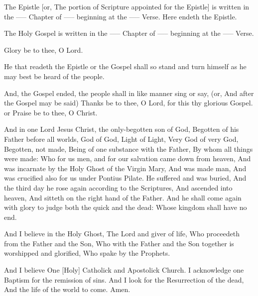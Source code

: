 
The Epistle [or, The portion of Scripture appointed for the Epistle] is written in the ----- Chapter of ----- beginning at the ----- Verse. 
 Here endeth the Epistle.

The Holy Gospel is written in the ----- Chapter of ----- beginning at the ----- Verse.
\centerline{\R Glory be to thee, O Lord.}

He that readeth the Epistle or the Gospel shall so stand and turn himself as he may best be heard of the people.

And, the Gospel ended, the people shall in like manner sing or say, (or, And after the Gospel may be said)
Thanks be to thee, O Lord, for this thy glorious Gospel. %
or
Praise be to thee, O Christ.




And in one Lord Jesus Christ, the only-begotten son of God, Begotten of his Father before all worlds, God of God, Light of Light, Very God of very God, Begotten, not made, Being of one substance with the Father, By whom all things were made: Who for us men, and for our salvation came down from heaven, And was incarnate by the Holy Ghost of the Virgin Mary, And was made man, And was crucified also for us under Pontius Pilate. He suffered and was buried, And the third day he rose again according to the Scriptures, And ascended into heaven, And sitteth on the right hand of the Father. And he shall come again with glory to judge both the quick and the dead: Whose kingdom shall have no end.

And I believe in the Holy Ghost, The Lord and giver of life, Who proceedeth from the Father and the Son, Who with the Father and the Son together is worshipped and glorified, Who spake by the Prophets. 

And I believe One [Holy] Catholick and Apostolick Church. I acknowledge one Baptism for the remission of sins. And I look for the Resurrection of the dead, And the life of the world to come. Amen.

